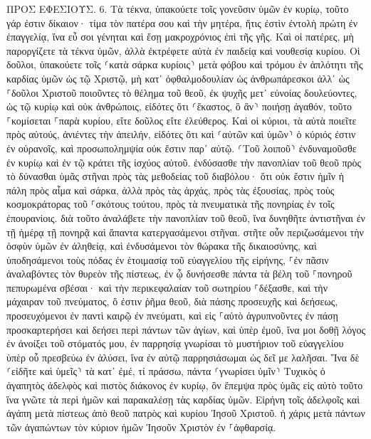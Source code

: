 \documentclass[twoside, 9pt]{extreport}
\begin{document}
ΠΡΟΣ ΕΦΕΣΙΟΥΣ.
6.
Τὰ τέκνα, ὑπακούετε τοῖς γονεῦσιν ὑμῶν ἐν κυρίῳ, τοῦτο γάρ ἐστιν δίκαιον· 
τίμα τὸν πατέρα σου καὶ τὴν μητέρα, ἥτις ἐστὶν ἐντολὴ πρώτη ἐν ἐπαγγελίᾳ, 
ἵνα εὖ σοι γένηται καὶ ἔσῃ μακροχρόνιος ἐπὶ τῆς γῆς. 
Καὶ οἱ πατέρες, μὴ παροργίζετε τὰ τέκνα ὑμῶν, ἀλλὰ ἐκτρέφετε αὐτὰ ἐν παιδείᾳ καὶ νουθεσίᾳ κυρίου. 
Οἱ δοῦλοι, ὑπακούετε τοῖς ⸂κατὰ σάρκα κυρίοις⸃ μετὰ φόβου καὶ τρόμου ἐν ἁπλότητι τῆς καρδίας ὑμῶν ὡς τῷ Χριστῷ, 
μὴ κατ᾽ ὀφθαλμοδουλίαν ὡς ἀνθρωπάρεσκοι ἀλλ᾽ ὡς ⸀δοῦλοι Χριστοῦ ποιοῦντες τὸ θέλημα τοῦ θεοῦ, ἐκ ψυχῆς 
μετ᾽ εὐνοίας δουλεύοντες, ὡς τῷ κυρίῳ καὶ οὐκ ἀνθρώποις, 
εἰδότες ὅτι ⸂ἕκαστος, ὃ ἂν⸃ ποιήσῃ ἀγαθόν, τοῦτο ⸀κομίσεται ⸀παρὰ κυρίου, εἴτε δοῦλος εἴτε ἐλεύθερος. 
Καὶ οἱ κύριοι, τὰ αὐτὰ ποιεῖτε πρὸς αὐτούς, ἀνιέντες τὴν ἀπειλήν, εἰδότες ὅτι καὶ ⸂αὐτῶν καὶ ὑμῶν⸃ ὁ κύριός ἐστιν ἐν οὐρανοῖς, καὶ προσωπολημψία οὐκ ἔστιν παρ᾽ αὐτῷ. 
⸂Τοῦ λοιποῦ⸃ ἐνδυναμοῦσθε ἐν κυρίῳ καὶ ἐν τῷ κράτει τῆς ἰσχύος αὐτοῦ. 
ἐνδύσασθε τὴν πανοπλίαν τοῦ θεοῦ πρὸς τὸ δύνασθαι ὑμᾶς στῆναι πρὸς τὰς μεθοδείας τοῦ διαβόλου· 
ὅτι οὐκ ἔστιν ἡμῖν ἡ πάλη πρὸς αἷμα καὶ σάρκα, ἀλλὰ πρὸς τὰς ἀρχάς, πρὸς τὰς ἐξουσίας, πρὸς τοὺς κοσμοκράτορας τοῦ ⸀σκότους τούτου, πρὸς τὰ πνευματικὰ τῆς πονηρίας ἐν τοῖς ἐπουρανίοις. 
διὰ τοῦτο ἀναλάβετε τὴν πανοπλίαν τοῦ θεοῦ, ἵνα δυνηθῆτε ἀντιστῆναι ἐν τῇ ἡμέρᾳ τῇ πονηρᾷ καὶ ἅπαντα κατεργασάμενοι στῆναι. 
στῆτε οὖν περιζωσάμενοι τὴν ὀσφὺν ὑμῶν ἐν ἀληθείᾳ, καὶ ἐνδυσάμενοι τὸν θώρακα τῆς δικαιοσύνης, 
καὶ ὑποδησάμενοι τοὺς πόδας ἐν ἑτοιμασίᾳ τοῦ εὐαγγελίου τῆς εἰρήνης, 
⸀ἐν πᾶσιν ἀναλαβόντες τὸν θυρεὸν τῆς πίστεως, ἐν ᾧ δυνήσεσθε πάντα τὰ βέλη τοῦ ⸀πονηροῦ πεπυρωμένα σβέσαι· 
καὶ τὴν περικεφαλαίαν τοῦ σωτηρίου ⸀δέξασθε, καὶ τὴν μάχαιραν τοῦ πνεύματος, ὅ ἐστιν ῥῆμα θεοῦ, 
διὰ πάσης προσευχῆς καὶ δεήσεως, προσευχόμενοι ἐν παντὶ καιρῷ ἐν πνεύματι, καὶ εἰς ⸀αὐτὸ ἀγρυπνοῦντες ἐν πάσῃ προσκαρτερήσει καὶ δεήσει περὶ πάντων τῶν ἁγίων, 
καὶ ὑπὲρ ἐμοῦ, ἵνα μοι δοθῇ λόγος ἐν ἀνοίξει τοῦ στόματός μου, ἐν παρρησίᾳ γνωρίσαι τὸ μυστήριον τοῦ εὐαγγελίου 
ὑπὲρ οὗ πρεσβεύω ἐν ἁλύσει, ἵνα ἐν αὐτῷ παρρησιάσωμαι ὡς δεῖ με λαλῆσαι. 
Ἵνα δὲ ⸂εἰδῆτε καὶ ὑμεῖς⸃ τὰ κατ᾽ ἐμέ, τί πράσσω, πάντα ⸂γνωρίσει ὑμῖν⸃ Τυχικὸς ὁ ἀγαπητὸς ἀδελφὸς καὶ πιστὸς διάκονος ἐν κυρίῳ, 
ὃν ἔπεμψα πρὸς ὑμᾶς εἰς αὐτὸ τοῦτο ἵνα γνῶτε τὰ περὶ ἡμῶν καὶ παρακαλέσῃ τὰς καρδίας ὑμῶν. 
Εἰρήνη τοῖς ἀδελφοῖς καὶ ἀγάπη μετὰ πίστεως ἀπὸ θεοῦ πατρὸς καὶ κυρίου Ἰησοῦ Χριστοῦ. 
ἡ χάρις μετὰ πάντων τῶν ἀγαπώντων τὸν κύριον ἡμῶν Ἰησοῦν Χριστὸν ἐν ⸀ἀφθαρσίᾳ. 
\end{document}
